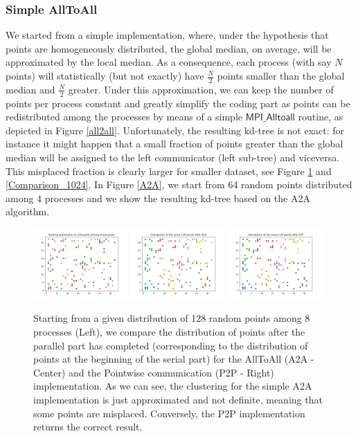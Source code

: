 \documentclass[amssymb, aps,nofootinbib, superscriptaddress, notitlepage]{revtex4}
\begin{document}
\subsubsection{Simple AllToAll}
We started from a simple implementation, where, under the  hypothesis that points are homogeneously distributed,   the global median, on average, will be approximated by the local median. As a consequence, each process  (with say $N$ points) will statistically (but not exactly) have $\frac{N}{2}$ points smaller than the global median and $\frac{N}{2}$ greater. Under this approximation, we can keep the number of points per process constant and greatly simplify the coding part as points can be redistributed among the processes by means of a simple $\textsf{MPI\_Alltoall}$ routine, as depicted in Figure \ref{all2all}.
Unfortunately,  the resulting kd-tree is not exact: for instance it might happen that a small fraction of points greater than the global median will be assigned to the left communicator (left sub-tree) and viceversa. This misplaced fraction is clearly larger for smaller dataset, see Figure \ref{Comparison_128} and \ref{Comparison_1024}. 
In Figure \ref{A2A}, we start from 64 random points distributed among 4 processes and we show the resulting kd-tree based on the A2A algorithm.
\begin{figure}
  \centering
      \includegraphics[width=0.32\textwidth]{img/Starting_128.png}
      \includegraphics[width=0.32\textwidth]{img/A2A_128.png}
      \includegraphics[width=0.32\textwidth]{img/P2P_128.png}
 \caption{Starting from a given distribution of 128 random points among 8 processes (Left), we compare the distribution of points after the parallel part has completed (corresponding to the distribution of points at the beginning of the serial part) for the AllToAll (A2A - Center) and the Pointwise communication (P2P - Right) implementation. As we can see, the clustering for the simple A2A implementation is just approximated and not definite, meaning that some points are misplaced. Conversely, the P2P implementation returns the correct result.}
\label{Comparison_128}
\end{figure}
\end{document}
